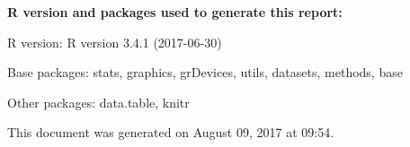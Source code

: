 \documentclass[11pt, a4paper]{report}\usepackage[]{graphicx}\usepackage[]{color}
\newcommand{\prog}[1]{\textsf{#1}}
\begin{document}
\newpage



\newpage
{}


%

\vfill

\footnotesize

{\bf \prog{R} version and packages used to generate this report:}

\prog{R} version: \textsf{R version 3.4.1 (2017-06-30)}

Base packages: \textsf{stats, graphics, grDevices, utils, datasets, methods, base}

Other packages: \textsf{data.table, knitr}

This document was generated on August 09, 2017 at 09:54.
\end{document}

